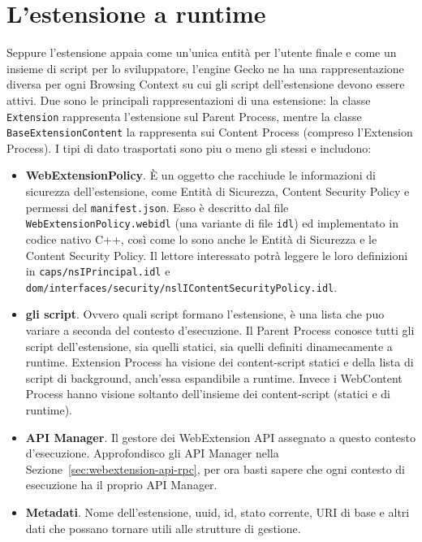 \documentclass{sapthesis}
\newcommand{\bold}[1]{\textbf{#1}}
\newcommand{\code}[1]{\texttt{#1}}
\newcommand{\file}[1]{\code{#1}}
\newcommand{\refSection}[1]{Sezione~\ref{#1}}
\newcommand{\manifest}{\code{manifest.json}}
\newcommand{\idl}{\code{idl}}
\begin{document}
    \section{L'estensione a runtime}
    \label{sec:webextension-extension-runtime}
        Seppure l'estensione appaia come un'unica entità per l'utente finale e come un insieme
        di script per lo sviluppatore, l'engine Gecko ne ha una rappresentazione diversa per
        ogni Browsing Context su cui gli script dell'estensione devono essere attivi.
        Due sono le principali rappresentazioni di una estensione: la classe \code{Extension}
        rappresenta l'estensione sul Parent Process, mentre la classe \code{BaseExtensionContent}
        la rappresenta sui Content Process (compreso l'Extension Process). I tipi di dato
        trasportati sono piu o meno gli stessi e includono:
        \begin{itemize}
            \item \bold{WebExtensionPolicy}. È un oggetto che racchiude le informazioni di sicurezza
                    dell'estensione, come Entità di Sicurezza, Content Security Policy e permessi del \manifest{}.
                    Esso è descritto dal file \file{WebExtensionPolicy.webidl} (una variante di file \idl{})
                    ed implementato in codice nativo C++, così come lo sono anche le Entità di Sicurezza
                    e le Content Security Policy. Il lettore interessato potrà leggere le loro definizioni
                    in \file{caps/nsIPrincipal.idl} e \file{dom/interfaces/security/nslIContentSecurityPolicy.idl}.

            \item \bold{gli script}. Ovvero quali script formano l'estensione, è una lista che puo
                    variare a seconda del contesto d'esecuzione. Il Parent Process conosce tutti gli
                    script dell'estensione, sia quelli statici, sia quelli definiti dinamecamente a
                    runtime. Extension Process ha visione dei content-script statici e della lista
                    di script di background, anch'essa espandibile a runtime. Invece i WebContent
                    Process hanno visione soltanto dell'insieme dei content-script (statici e di runtime).

            \item \bold{API Manager}. Il gestore dei WebExtension API assegnato a questo contesto
                    d'esecuzione. Approfondisco gli API Manager nella \refSection{sec:webextension-api-rpc},
                    per ora basti sapere che ogni contesto di esecuzione ha il proprio API Manager.

            \item \bold{Metadati}. Nome dell'estensione, uuid, id, stato corrente, URI di base e altri dati
                    che possano tornare utili alle strutture di gestione.
        \end{itemize}
    
\end{document}
